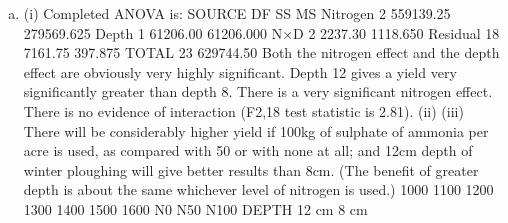\documentclass[a4paper,12pt]{article}
\begin{document}
\begin{enumerate}[(a)]
\item 
(i) Completed ANOVA is:
SOURCE DF SS MS
Nitrogen 2 559139.25 279569.625
Depth 1 61206.00 61206.000
N×D 2 2237.30 1118.650
Residual 18 7161.75 397.875
TOTAL 23 629744.50
Both the nitrogen effect and the depth effect are obviously very highly significant.
Depth 12 gives a yield very significantly greater than depth 8. There is a very
significant nitrogen effect.
There is no evidence of interaction (F2,18 test statistic is 2.81).
(ii)
(iii) There will be considerably higher yield if 100kg of sulphate of ammonia per
acre is used, as compared with 50 or with none at all; and 12cm depth of winter
ploughing will give better results than 8cm. (The benefit of greater depth is about the
same whichever level of nitrogen is used.)
1000
1100
1200
1300
1400
1500
1600
N0 N50 N100
DEPTH
12 cm
8 cm
\end{enumerate}
\end{document}
